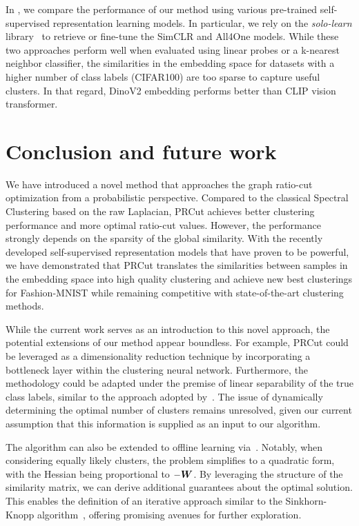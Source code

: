 In , we compare the performance of our method using various
pre-trained self-supervised representation learning models. In particular, we rely
on the \textit{solo-learn} library~\citep{sololearn} to retrieve or fine-tune the
SimCLR and All4One models. While these two approaches perform well when evaluated
using linear probes or a k-nearest neighbor classifier, the similarities in the
embedding space for datasets with a higher number of class labels (CIFAR100) are
too sparse to capture useful clusters. In that regard, DinoV2 embedding performs
better than CLIP vision transformer.

\section{Conclusion and future work}

We have introduced a novel method that approaches the graph ratio-cut optimization
from a probabilistic perspective. Compared to the classical Spectral Clustering
based on the raw Laplacian, PRCut achieves better clustering performance and more
optimal ratio-cut values. However, the performance strongly depends on the sparsity
of the global similarity. With the recently developed self-supervised
representation models that have proven to be powerful, we have demonstrated that
PRCut translates the similarities between samples in the embedding space into high
quality clustering and achieve new best clusterings for Fashion-MNIST while
remaining competitive with state-of-the-art clustering methods.

While the current work serves as an introduction to this novel approach, the
potential extensions of our method appear boundless. For example, PRCut could be
leveraged as a dimensionality reduction technique by incorporating a bottleneck
layer within the clustering neural network. Furthermore, the methodology could be
adapted under the premise of linear separability of the true class labels, similar
to the approach adopted by~\citet{turtle}. The issue of dynamically determining the
optimal number of clusters remains unresolved, given our current assumption that
this information is supplied as an input to our algorithm.

The algorithm can also be extended to offline learning via~. Notably,
when considering equally likely clusters, the problem simplifies to a quadratic
form, with the Hessian being proportional to $-{\bm{W}}$. By leveraging the structure of
the similarity matrix, we can derive additional guarantees about the optimal
solution. This enables the definition of an iterative approach similar to the
Sinkhorn-Knopp algorithm~\citep{sinkhorn}, offering promising avenues for further
exploration.
